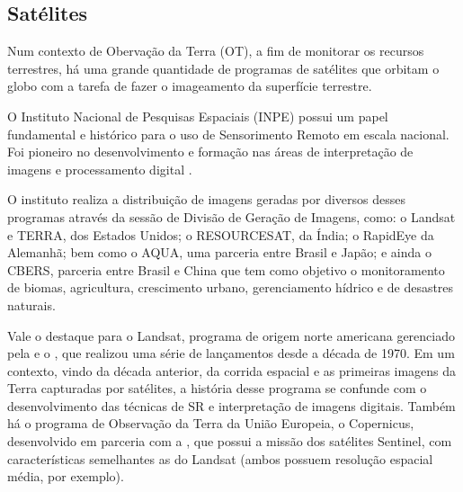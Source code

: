 

\subsection{Satélites}\label{satuxe9lites}

Num contexto de Obervação da Terra (OT), a fim de monitorar os
recursos terrestres, há uma grande quantidade de programas de satélites
que orbitam o globo com a tarefa de fazer o imageamento da superfície
terrestre. 

O Instituto Nacional de Pesquisas Espaciais (INPE) possui um papel
fundamental e histórico para o uso de Sensorimento Remoto em escala nacional. Foi pioneiro no desenvolvimento e formação nas áreas de interpretação de imagens e processamento digital \cite{meneses2012introduccao}.

O instituto realiza a distribuição de imagens geradas por
diversos desses programas através da sessão de Divisão de Geração de
Imagens, como: o Landsat e TERRA, dos Estados Unidos; o
RESOURCESAT, da Índia; o RapidEye da Alemanhã; bem como o AQUA, uma parceria entre Brasil e Japão; e ainda o CBERS, parceria entre Brasil e China que tem como objetivo o monitoramento de biomas, agricultura,
crescimento urbano, gerenciamento hídrico e de desastres naturais. \cite{inpe-dgi}

Vale o destaque para o Landsat, programa de origem norte americana
gerenciado pela   e
o , que realizou uma série de
lançamentos desde a década de 1970. Em um contexto, vindo da década
anterior, da corrida espacial e as primeiras imagens da Terra capturadas
por satélites, a história desse programa se confunde com o
desenvolvimento das técnicas de SR e interpretação de imagens digitais.
Também há o programa de Observação da Terra da União Europeia, o Copernicus, desenvolvido
em parceria com a , que possui a missão dos satélites Sentinel, com características semelhantes as do Landsat (ambos possuem resolução espacial média, por exemplo).

